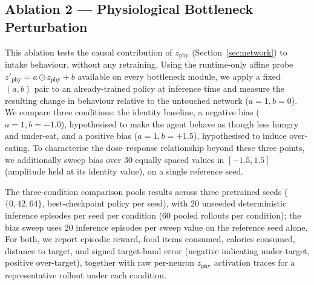 \documentclass[10pt,twocolumn]{article}
\begin{document}
\subsection{Ablation 2 --- Physiological Bottleneck Perturbation}
\label{sec:ablation2}

This ablation tests the causal contribution of $z_\text{phy}$ (Section~\ref{sec:network}) to intake behaviour, without any retraining. Using the runtime-only affine probe $z'_\text{phy}=a\odot z_\text{phy}+b$ available on every bottleneck module, we apply a fixed $(a,b)$ pair to an already-trained policy at inference time and measure the resulting change in behaviour relative to the untouched network ($a{=}1,b{=}0$). We compare three conditions: the identity baseline, a negative bias ($a{=}1,b{=}-1.0$), hypothesised to make the agent behave as though less hungry and under-eat, and a positive bias ($a{=}1,b{=}+1.5$), hypothesised to induce over-eating. To characterise the dose--response relationship beyond these three points, we additionally sweep bias over 30 equally spaced values in $[-1.5,1.5]$ (amplitude held at its identity value), on a single reference seed.

The three-condition comparison pools results across three pretrained seeds ($\{0,42,64\}$, best-checkpoint policy per seed), with 20 unseeded deterministic inference episodes per seed per condition (60 pooled rollouts per condition); the bias sweep uses 20 inference episodes per sweep value on the reference seed alone. For both, we report episodic reward, food items consumed, calories consumed, distance to target, and signed target-band error (negative indicating under-target, positive over-target), together with raw per-neuron $z_\text{phy}$ activation traces for a representative rollout under each condition.
\end{document}
